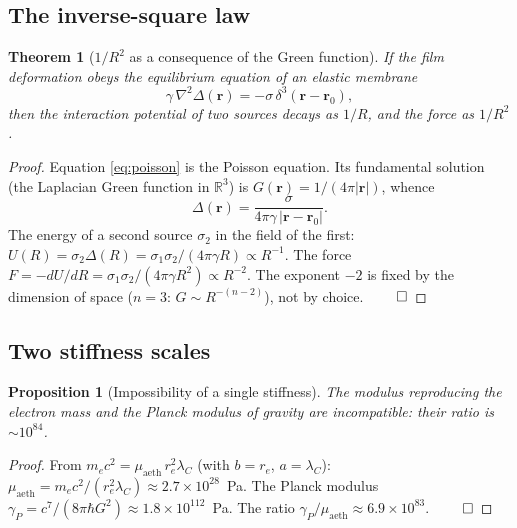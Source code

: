 \documentclass[12pt,a4paper]{article}
\newtheorem{theorem}{Theorem}
\newtheorem{proposition}{Proposition}
\begin{document}
\subsection{The inverse-square law}
\begin{theorem}[$1/R^2$ as a consequence of the Green function]
\label{th:invsq}
If the film deformation obeys the equilibrium equation of an elastic membrane
\begin{equation}
\gamma\,\nabla^2\Delta(\mathbf{r})=-\sigma\,\delta^3(\mathbf{r}-\mathbf{r}_0),
\label{eq:poisson}
\end{equation}
then the interaction potential of two sources decays as $1/R$, and the force as
$1/R^2$.
\end{theorem}
\begin{proof}
Equation \eqref{eq:poisson} is the Poisson equation. Its fundamental solution
(the Laplacian Green function in $\mathbb{R}^3$) is $G(\mathbf{r})=1/(4\pi|\mathbf{r}|)$,
whence
\begin{equation}
\Delta(\mathbf{r})=\frac{\sigma}{4\pi\gamma\,|\mathbf{r}-\mathbf{r}_0|}.
\end{equation}
The energy of a second source $\sigma_2$ in the field of the first:
$U(R)=\sigma_2\Delta(R)=\sigma_1\sigma_2/(4\pi\gamma R)\propto R^{-1}$.
The force $F=-dU/dR=\sigma_1\sigma_2/(4\pi\gamma R^2)\propto R^{-2}$.
The exponent $-2$ is fixed by the dimension of space ($n=3$: $G\sim R^{-(n-2)}$),
not by choice. $\qed$
\end{proof}

\subsection{Two stiffness scales}
\begin{proposition}[Impossibility of a single stiffness]
The modulus reproducing the electron mass and the Planck modulus of gravity are
incompatible: their ratio is $\sim 10^{84}$.
\end{proposition}
\begin{proof}
From $m_e c^2=\mu_{\text{aeth}}\,r_e^2\lambda_C$ (with $b=r_e$, $a=\lambda_C$):
$\mu_{\text{aeth}}=m_ec^2/(r_e^2\lambda_C)\approx2.7\times10^{28}$~Pa.
The Planck modulus $\gamma_P=c^7/(8\pi\hbar G^2)\approx1.8\times10^{112}$~Pa.
The ratio $\gamma_P/\mu_{\text{aeth}}\approx6.9\times10^{83}$. $\qed$
\end{proof}
\end{document}
